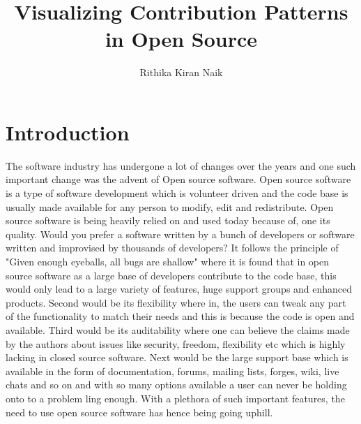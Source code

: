 \documentclass[seploa]{beavtex}
\title{Visualizing Contribution Patterns in Open Source}
\author{Rithika Kiran Naik}
\begin{document}
\maketitle

\mainmatter

\chapter{Introduction}
The software industry has undergone a lot of changes over the years and one such important change was the advent of Open source software. Open source software is a type of software development which is volunteer driven\cite{ghosh2005} and the code base is usually made available for any person to modify, edit and redistribute\cite{osdef}. Open source software is being heavily relied on and used today because of, one its quality. Would you prefer a software written by a bunch of developers or software written and improvised by thousands of developers? It follows the principle of "Given enough eyeballs, all bugs are shallow"\cite{linuslaw} where it is found that in open source software as a large base of developers contribute to the code base, this would only lead to a large variety of features, huge support groups and enhanced products\cite{pcwr}. Second would be its flexibility where in, the users can tweak any part of the functionality to match their needs and this is because the code is open and available\cite{pcwr}. Third would be its auditability where one can believe the claims made by the authors about issues like security, freedom, flexibility etc which is highly lacking in closed source software\cite{pcwr}. Next would be the large support base which is available in the form of documentation, forums, mailing lists, forges, wiki, live chats and so on and with so many options available a user can never be holding onto to a problem ling enough. With a plethora of such important features, the need to use open source software has hence being going uphill.
\end{document}
